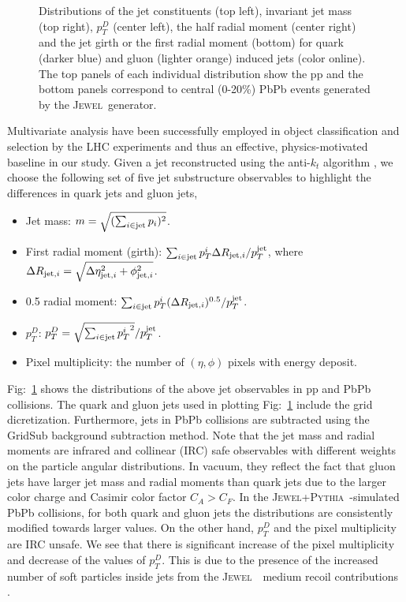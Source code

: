 \documentclass[notoc]{JHEP3}
\newcommand{\jw}{\textsc{Jewel}~}
\newcommand{\jwpy}{\textsc{Jewel+Pythia}~}
\begin{document}
\begin{figure}[h]
	   \caption{Distributions of the jet constituents (top left), invariant jet mass (top right), $p^{D}_{T}$ (center left), the half radial moment (center right) and the jet girth or the first radial moment (bottom) for quark (darker blue) and gluon (lighter orange) induced jets (color online). The top panels of each individual distribution show the pp and the bottom panels correspond to central (0-20\%) PbPb events generated by the \jw generator.}
	   \label{fig:jetdistributons_pp_pbpb}
	\end{figure}

Multivariate analysis have been successfully employed in object classification and selection by the LHC experiments \cite{} and thus an effective, physics-motivated baseline in our study. Given a jet reconstructed using the anti-$k_{t}$ algorithm \cite{Cacciari:2008gp}, we choose the following set of five jet substructure observables \cite{} to highlight the differences in quark jets and gluon jets,
	\begin{itemize}
		\item Jet mass: $m = \sqrt{(\sum_{i\in {\rm jet}} p_i)^2}$. 
        \item First radial moment (girth): $\sum_{i \in {\rm jet}} p^i_{T} \Delta R_{{\rm jet}, i}/p^{\rm jet}_{T}$, where $\Delta R_{{\rm jet}, i}=\sqrt{\Delta \eta^2_{{\rm jet}, i}+\phi^2_{{\rm jet}, i}}$.
		\item 0.5 radial moment:  $\sum_{i \in {\rm jet}} p^i_{T} (\Delta R_{{\rm jet}, i})^{0.5}/p^{\rm jet}_{T}$.
        \item $p_{T}^{D}$: $p^{D}_{T} = \sqrt{\sum_{i \in {\rm jet}} {p^{i}_{T}}^2}/p^{\rm jet}_{T}$.
        \item Pixel multiplicity: the number of $(\eta,\phi)$ pixels with energy deposit. %
	\end{itemize}

Fig:~\ref{fig:jetdistributons_pp_pbpb} shows the distributions of the above jet observables in pp and PbPb collisions. The quark and gluon jets used in plotting Fig:~\ref{fig:jetdistributons_pp_pbpb} include the grid dicretization. Furthermore, jets in PbPb collisions are subtracted using the GridSub background subtraction method. Note that the jet mass and radial moments are infrared and collinear (IRC) safe observables with different weights on the particle angular distributions. In vacuum, they reflect the fact that gluon jets have larger jet mass and radial moments than quark jets due to the larger color charge and Casimir color factor $C_A>C_F$. In the \jwpy-simulated PbPb collisions, for both quark and gluon jets the distributions are consistently modified towards larger values. On the other hand, $p_T^D$ and the pixel multiplicity are IRC unsafe. We see that there is significant increase of the pixel multiplicity and decrease of the values of $p_T^D$. This is due to the presence of the increased number of soft particles inside jets from the \jw ~medium recoil contributions \cite{}.
\end{document}
